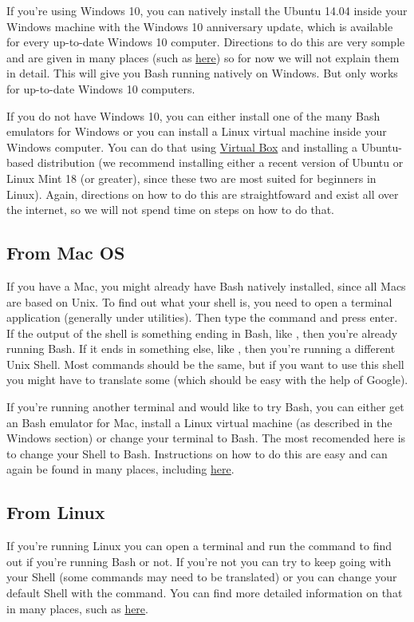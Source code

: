 \documentclass[letterpaper,10pt,openany,oneside]{sphinxmanual}
\begin{document}
If you're using Windows 10, you can natively install the Ubuntu 14.04 inside
your Windows machine with the Windows 10 anniversary update, which is available
for every up-to-date Windows 10 computer. Directions to do this are very somple
and are given in many places (such as \href{http://www.howtogeek.com/249966/how-to-install-and-use-the-linux-bash-shell-on-windows-10/}{here})
so for now we will not explain them in detail. This will give you Bash running
natively on Windows. But only works for up-to-date Windows 10 computers.

If you do not have Windows 10, you can either install one of the many Bash
emulators for Windows or you can install a Linux virtual machine inside your
Windows computer.  You can do that using \href{https://www.virtualbox.org/wiki/Downloads}{Virtual Box} and installing a Ubuntu-based
distribution (we recommend installing either a recent version of Ubuntu or
Linux Mint 18 (or greater), since these two are most suited for beginners in
Linux). Again, directions on how to do this are straightfoward and exist all
over the internet, so we will not spend time on steps on how to do that.


\subsection{From Mac OS}
\label{bash:from-mac-os}
If you have a Mac, you might already have Bash natively installed, since all
Macs are based on Unix. To find out what your shell is, you need to open a
terminal application (generally under utilities). Then type the command  and press enter. If the output of the shell is something ending in
Bash, like , then you're already running Bash. If it ends in
something else, like , then you're running a different Unix Shell.
Most commands should be the same, but if you want to use this shell you might
have to translate some (which should be easy with the help of Google).

If you're running another terminal and would like to try Bash, you can either
get an Bash emulator for Mac, install a Linux virtual machine (as described in
the Windows section) or change your terminal to Bash. The most recomended here
is to change your Shell to Bash. Instructions on how to do this are easy and
can again be found in many places, including \href{http://osxdaily.com/2012/03/21/change-shell-mac-os-x/}{here}.


\subsection{From Linux}
\label{bash:from-linux}
If you're running Linux you can open a terminal and run the command  to find out if you're running Bash or not. If you're not you can try to
keep going with your Shell (some commands may need to be translated) or you can
change your default Shell with the  command. You can find more detailed
information on that in many places, such as \href{http://stackoverflow.com/questions/13046192/changing-default-shell-in-linux}{here}.
\end{document}
